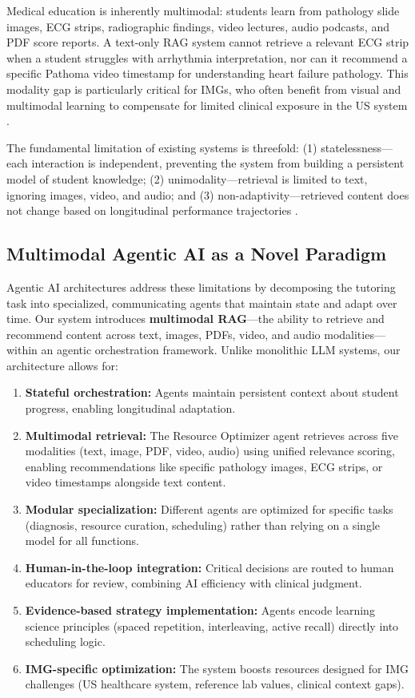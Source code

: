 Medical education is inherently multimodal: students learn from pathology slide images, ECG strips, radiographic findings, video lectures, audio podcasts, and PDF score reports. A text-only RAG system cannot retrieve a relevant ECG strip when a student struggles with arrhythmia interpretation, nor can it recommend a specific Pathoma video timestamp for understanding heart failure pathology. This modality gap is particularly critical for IMGs, who often benefit from visual and multimodal learning to compensate for limited clinical exposure in the US system \cite{wang2024multimodal}.

The fundamental limitation of existing systems is threefold: (1) statelessness—each interaction is independent, preventing the system from building a persistent model of student knowledge; (2) unimodality—retrieval is limited to text, ignoring images, video, and audio; and (3) non-adaptivity—retrieved content does not change based on longitudinal performance trajectories \cite{wang2024adaptive}.

\subsection{Multimodal Agentic AI as a Novel Paradigm}

Agentic AI architectures address these limitations by decomposing the tutoring task into specialized, communicating agents that maintain state and adapt over time. Our system introduces \textbf{multimodal RAG}—the ability to retrieve and recommend content across text, images, PDFs, video, and audio modalities—within an agentic orchestration framework. Unlike monolithic LLM systems, our architecture allows for:

\begin{enumerate}
    \item \textbf{Stateful orchestration:} Agents maintain persistent context about student progress, enabling longitudinal adaptation.
    \item \textbf{Multimodal retrieval:} The Resource Optimizer agent retrieves across five modalities (text, image, PDF, video, audio) using unified relevance scoring, enabling recommendations like specific pathology images, ECG strips, or video timestamps alongside text content.
    \item \textbf{Modular specialization:} Different agents are optimized for specific tasks (diagnosis, resource curation, scheduling) rather than relying on a single model for all functions.
    \item \textbf{Human-in-the-loop integration:} Critical decisions are routed to human educators for review, combining AI efficiency with clinical judgment.
    \item \textbf{Evidence-based strategy implementation:} Agents encode learning science principles (spaced repetition, interleaving, active recall) directly into scheduling logic.
    \item \textbf{IMG-specific optimization:} The system boosts resources designed for IMG challenges (US healthcare system, reference lab values, clinical context gaps).
\end{enumerate}

